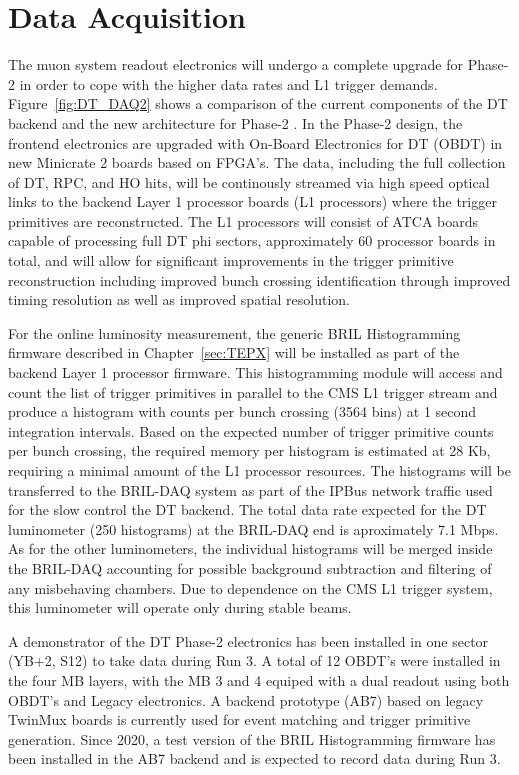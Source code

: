 \section{Data Acquisition}

The muon system readout electronics will undergo a complete upgrade for Phase-2 in order to cope with the higher data rates and L1 trigger demands.
Figure~\ref{fig:DT_DAQ2} shows a comparison of the current components of the DT backend and the new architecture for Phase-2 \cite{CERN-LHCC-2017-012}.
In the Phase-2 design, the frontend electronics are upgraded with On-Board Electronics for DT (OBDT) in new Minicrate 2 boards based on FPGA's.
The data, including the full collection of DT, RPC, and HO hits, will be continously streamed via high speed optical
links to the backend Layer 1 processor boards (L1 processors) where the trigger primitives are reconstructed.
The L1 processors will consist of ATCA boards capable of processing full DT phi sectors, approximately 60 processor boards in total,
and will allow for significant improvements in the trigger primitive reconstruction including improved bunch crossing identification
through improved timing resolution as well as improved spatial resolution. 


For the online luminosity measurement, the generic BRIL Histogramming firmware described in Chapter~\ref{sec:TEPX} will be installed as part of the backend Layer 1 processor firmware.
This histogramming module will access and count the list of trigger primitives in parallel to the CMS L1 trigger stream
and produce a histogram with counts per bunch crossing (3564 bins) at 1 second integration intervals.
Based on the expected number of trigger primitive counts per bunch crossing, the required memory per histogram is estimated at 28 Kb, requiring a minimal amount of the L1 processor resources. 
The histograms  will be transferred to the BRIL-DAQ system as part of the IPBus network traffic used for the slow control the DT backend.
The total data rate expected for the DT luminometer (250 histograms) at the BRIL-DAQ end is aproximately 7.1 Mbps.
As for the other luminometers, the individual histograms will be merged inside the BRIL-DAQ accounting for possible background subtraction and filtering of any misbehaving chambers.
Due to dependence on the CMS L1 trigger system, this luminometer will operate only during stable beams.

A demonstrator of the DT Phase-2 electronics has been installed in one sector (YB+2, S12) to take data during Run 3.
A total of 12 OBDT's were installed in the four MB layers, with the MB 3 and 4 equiped with a dual readout using both OBDT's and Legacy electronics.
A backend prototype (AB7) based on legacy TwinMux boards is currently used for event matching and trigger primitive generation.
Since 2020, a test version of the BRIL Histogramming firmware has been installed in the AB7 backend and is expected to record data during Run 3.




